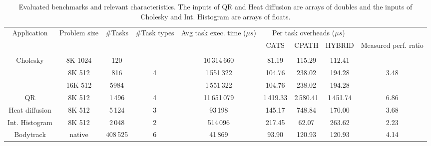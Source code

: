\begin{table}
	\scriptsize
	\begin{center}
		\caption{Evaluated benchmarks and relevant characteristics. The inputs of QR and Heat diffusion are arrays of doubles and the inputs of Cholesky and Int. Histogram are arrays of floats.}
		\label{tab.sched.apps}
		\begin{tabular}{|c|c|c|c|c|c|c|c|c|}
			\hline
			\multirow{2}{*}{\parbox{10mm}{\centering Application}} & 
			\multirow{2}{*}{\parbox{9mm}{\centering Problem size}} & 
			\multirow{2}{*}{\parbox{9mm}{\centering \#Tasks}} & 
			\multirow{2}{*}{\parbox{9mm}{\centering \#Task types}} & 
			\multirow{2}{*}{\parbox{18mm}{\centering Avg task exec. time (${\mu}s$)}} & 
			\multicolumn{3}{|c|}{Per task overheads (${\mu}s$)} &\\
			\cline{6-8}
			& & & & & {\parbox{10mm}{\centering CATS}} & {\parbox{10mm}{\centering CPATH}} & {\parbox{11mm}{\centering HYBRID}} &
			
			\multirow{2}{*}{\parbox{13mm}{\centering Measured perf. ratio}} \\
			& & & & & & & & \\ %
			\hline
			
			\multirow{3}{*}{Cholesky} 
			& 8K 1024 & 120 & & 10\,314\,660 & 81.19 &  115.29 &  112.41 & \\                                              
			& 8K 512 & 816 & 4 & 1\,551\,322 & 104.76 &  238.02 &  194.28 &3.48 \\ 
			& 16K 512 & 5984 & & 1\,551\,322 & 104.76 &  238.02 &  194.28  & \\ 
			\hline{}
			QR & 8K 512 & 1\,496 & 4 & 11\,651\,079  &   1\,419.33 & 2\,580.41 &   1\,451.74 & 6.86 \\ 
			\hline
			Heat diffusion & 8K 512 & 5\,124 & 3 & 93\,198  &   145.17  &  748.84 &  170.00& 3.68 \\
			\hline
			Int. Histogram & 8K 512 & 2\,048 & 2 & 514\,096 &  217.45 &  62.07 & 263.62  & 2.23 \\ 
			\hline
			Bodytrack & native & 408\,525 &  6 & 41\,869 & 93.90 & 120.93 &  120.93 & 4.14 \\
			\hline
		\end{tabular} 
	\end{center}
\end{table}
\normalsize
